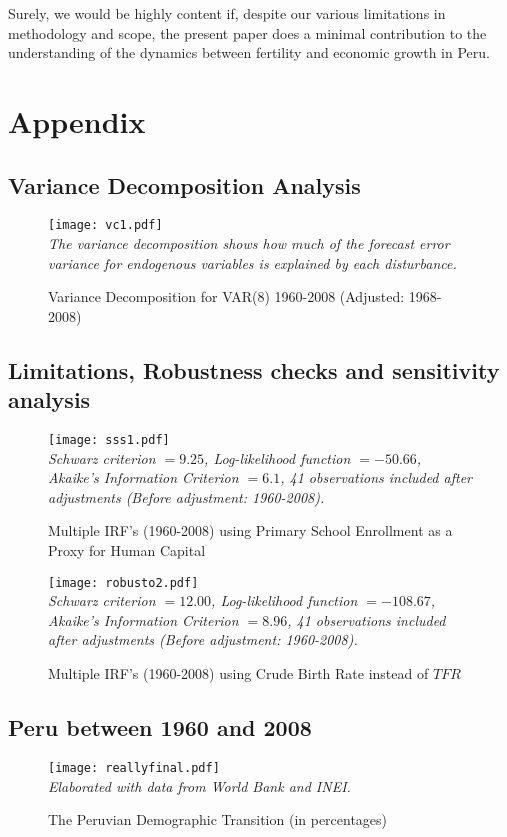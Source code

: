 \documentclass[12pt]{article}%
\begin{document}
Surely, we would be highly content if, despite our various limitations in methodology and scope, the present paper does a minimal contribution to the understanding of the dynamics between fertility and economic growth in Peru.

\pagebreak%
\appendix
\section*{Appendix}
\subsection*{Variance Decomposition Analysis}
\begin{figure}[h]
\caption{Variance Decomposition for VAR(8) 1960-2008 (Adjusted: 1968-2008)}
\centering
\texttt{[image: vc1.pdf]} \\
\footnotesize
\textit{The variance decomposition shows how much of the forecast error variance for endogenous variables is explained by each disturbance.}
\label{VarianceAnalysis}
\end{figure}
\pagebreak%
\subsection*{Limitations, Robustness checks and sensitivity analysis}
\begin{figure}[h]
\caption{Multiple IRF's (1960-2008) using Primary School Enrollment as a Proxy for Human Capital}
\centering
\texttt{[image: sss1.pdf]} \\
\footnotesize
\textit{Schwarz criterion $=9.25$, Log-likelihood function $=-50.66$, Akaike's Information Criterion $=6.1$, 41 observations included after adjustments (Before adjustment: 1960-2008).}
\label{Sensitivity1}
\end{figure}
\pagebreak%
\begin{figure}[h]
\caption{Multiple IRF's (1960-2008) using Crude Birth Rate instead of $TFR$}
\centering
\texttt{[image: robusto2.pdf]} \\
\footnotesize
\textit{Schwarz criterion $=12.00$, Log-likelihood function $=-108.67$, Akaike's Information Criterion $=8.96$, 41 observations included after adjustments (Before adjustment: 1960-2008).}
\label{Sensitivity2}
\end{figure}
\pagebreak%
\subsection*{Peru between 1960 and 2008}
\begin{figure}[h]
\caption{The Peruvian Demographic Transition (in percentages)}
\centering
\texttt{[image: reallyfinal.pdf]} \\
\footnotesize
\textit{Elaborated with data from World Bank and INEI.}
\label{magdalena}
\end{figure}
\normalsize
\pagebreak%


\end{document}
